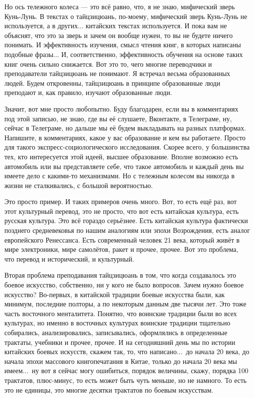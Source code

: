 Но ось тележного колеса --- это всё 
равно,  что, я не знаю,  мифический зверь Кунь-Лунь.  В 
текстах о тайцзицюань, по-моему, мифический зверь 
Кунь-Лунь не используется, а в других... китайских 
текстах используется. И пока вам не объяснят, что это 
за зверь и зачем он вообще нужен,  то вы не будете 
ничего понимать. И эффективность изучения,  смысл
чтения книг, в которых написаны подобные фразы...  И, 
соответственно, эффективность обучения на основе 
таких книг очень сильно снижается.  Вот это то, чего 
многие переводчики и преподаватели тайцзицюань не 
понимают. Я встречал весьма образованных людей.  Будем 
откровенны, тайцзицюань в принципе образованные люди 
преподают и, как правило, изучают образованные люди. 

Значит,  вот мне просто любопытно. Буду благодарен, 
если вы в комментариях  под этой записью, не знаю, где 
вы её слушаете, Вконтакте, в Телеграме, ну, сейчас в 
Телеграме, но дальше мы её будем выкладывать на разных 
платформах. Напишите,  в комментариях,  какое у вас 
образование и кем вы работаете. Просто для такого 
экспресс-социологического исследования. Скорее 
всего,  у большинства тех, кто интересуется этой идеей, 
высшее образование.  Вполне возможно есть 
автомобиль или вы представляете себе, что такое 
автомобиль и каждый день вы имеете дело с какими-то 
механизмами. Но с тележным колесом вы никогда в жизни 
не сталкивались, с большой вероятностью.

Это просто 
пример.  И таких примеров очень много.  Вот, то есть ещё
раз, вот этот культурный перевод, это не просто, что 
вот есть китайская культура, есть русская культура.  
Это всё гораздо серьёзнее. Есть китайская культура 
фактически позднего средневековья по нашим аналогиям 
или эпохи Возрождения,  есть аналог европейского 
Ренессанса. Есть современный человек 21 века, который 
живёт в мире электроники, мире самолётов, ракет и 
прочее, прочее. Вот это проблема, что перевод и 
исторический,  и культурный.

Вторая проблема 
преподавания тайцзицюань в том,  что когда создавалось 
это боевое искусство, собственно, ни у кого не было 
вопросов. Зачем нужно боевое искусство?  Во-первых,  
в китайской традиции боевые искусства были, как 
минимум,  последние полторы, а по некоторым данным две 
тысячи лет. Это тоже часть восточного менталитета.  
Понятно, что воинские традиции были во всех культурах, 
но именно в восточных культурах воинские традиции 
тщательно собирались, анализировались,  записывались, 
 оформлялись в определенные трактаты, учебники и 
прочее, прочее.  И на сегодняшний день мы по истории 
китайских боевых искусств, скажем так, то, что 
написано...\ до начала 20 века, до начала эпохи массового 
книгопечатания в Китае, только до начала 20 века мы 
имеем...\ ну вот я сейчас могу ошибиться,  порядок 
величины, скажу, порядка 100 трактатов,  плюс-минус, то 
есть может быть чуть меньше, но не намного. То есть это 
не единицы,  это многие десятки трактатов по боевым
искусствам.

